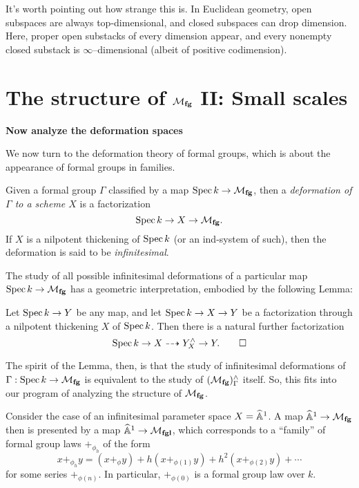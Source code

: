 \begin{remark}
It's worth pointing out how strange this is. In Euclidean geometry, open subspaces are always top-dimensional, and closed subspaces can drop dimension.  Here, proper open substacks of every dimension appear, and every nonempty closed substack is $\infty$--dimensional (albeit of positive codimension).
\end{remark}








\section{The structure of $\mathcal{M}_{\mathbf{fg}}$ II: Small scales}


\textbf{Now analyze the deformation spaces}

We now turn to the deformation theory of formal groups, which is about the appearance of formal groups in families.

\begin{definition}
Given a formal group $\Gamma$ classified by a map $\operatorname{Spec} k \to \mathcal{M}_{\mathbf{fg}}$, then a \textit{deformation of $\Gamma$ to a scheme $X$} is a factorization \[\operatorname{Spec} k \to X \to \mathcal{M}_{\mathbf{fg}}.\]  If $X$ is a nilpotent thickening of $\operatorname{Spec} k$ (or an ind-system of such), then the deformation is said to be \textit{infinitesimal}.
\end{definition}

The study of all possible infinitesimal deformations of a particular map $\operatorname{Spec} k \to \mathcal{M}_{\mathbf{fg}}$ has a geometric interpretation, embodied by the following Lemma:

\begin{lemma}
Let $\operatorname{Spec} k \to Y$ be any map, and let $\operatorname{Spec} k \to X \to Y$ be a factorization through a nilpotent thickening $X$ of $\operatorname{Spec} k$.  Then there is a natural further factorization \[\operatorname{Spec} k \to X \dashrightarrow Y^\wedge_X \to Y. \qed\]
\end{lemma}

\noindent The spirit of the Lemma, then, is that the study of infinitesimal deformations of $\Gamma: \operatorname{Spec} k \to \mathcal{M}_{\mathbf{fg}}$ is equivalent to the study of $(\mathcal{M}_{\mathbf{fg}})^\wedge_\Gamma$ itself.  So, this fits into our program of analyzing the structure of $\mathcal{M}_{\mathbf{fg}}$.

\begin{example}
Consider the case of an infinitesimal parameter space $X = \widehat{\mathbb{A}}^1$.  A map $\widehat{\mathbb{A}}^1 \to \mathcal{M}_{\mathbf{fg}}$ then is presented by a map $\widehat{\mathbb{A}}^1 \to \mathcal{M}_{\mathbf{fgl}}$, which corresponds to a ``family'' of formal group laws $+_{\phi_h}$ of the form \[x +_{\phi_h} y = (x +_\phi y) + h(x +_{\phi(1)} y) + h^2(x +_{\phi(2)} y) + \cdots\] for some series $+_{\phi(n)}$.  In particular, $+_{\phi(0)}$ is a formal group law over $k$.
\end{example}

